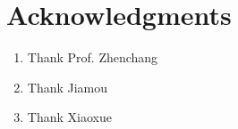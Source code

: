 \chapter*{Acknowledgments}

\begin{enumerate}
	\item Thank Prof. Zhenchang
	\item Thank Jiamou
	\item Thank Xiaoxue
\end{enumerate}
